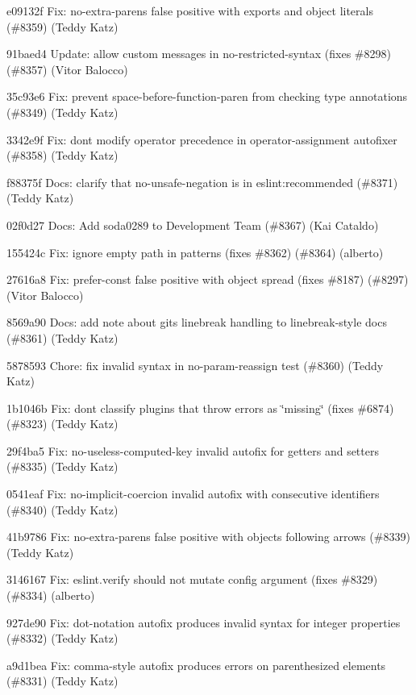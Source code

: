 \begin{DoxyItemize}
\item e09132f Fix\+: no-\/extra-\/parens false positive with exports and object literals (\#8359) (Teddy Katz)
\item 91baed4 Update\+: allow custom messages in no-\/restricted-\/syntax (fixes \#8298) (\#8357) (Vitor Balocco)
\item 35c93e6 Fix\+: prevent space-\/before-\/function-\/paren from checking type annotations (\#8349) (Teddy Katz)
\item 3342e9f Fix\+: don\textquotesingle{}t modify operator precedence in operator-\/assignment autofixer (\#8358) (Teddy Katz)
\item f88375f Docs\+: clarify that no-\/unsafe-\/negation is in eslint\+:recommended (\#8371) (Teddy Katz)
\item 02f0d27 Docs\+: Add soda0289 to Development Team (\#8367) (Kai Cataldo)
\item 155424c Fix\+: ignore empty path in patterns (fixes \#8362) (\#8364) (alberto)
\item 27616a8 Fix\+: prefer-\/const false positive with object spread (fixes \#8187) (\#8297) (Vitor Balocco)
\item 8569a90 Docs\+: add note about git\textquotesingle{}s linebreak handling to linebreak-\/style docs (\#8361) (Teddy Katz)
\item 5878593 Chore\+: fix invalid syntax in no-\/param-\/reassign test (\#8360) (Teddy Katz)
\item 1b1046b Fix\+: don\textquotesingle{}t classify plugins that throw errors as \char`\"{}missing\char`\"{} (fixes \#6874) (\#8323) (Teddy Katz)
\item 29f4ba5 Fix\+: no-\/useless-\/computed-\/key invalid autofix for getters and setters (\#8335) (Teddy Katz)
\item 0541eaf Fix\+: no-\/implicit-\/coercion invalid autofix with consecutive identifiers (\#8340) (Teddy Katz)
\item 41b9786 Fix\+: no-\/extra-\/parens false positive with objects following arrows (\#8339) (Teddy Katz)
\item 3146167 Fix\+: {\ttfamily eslint.\+verify} should not mutate config argument (fixes \#8329) (\#8334) (alberto)
\item 927de90 Fix\+: dot-\/notation autofix produces invalid syntax for integer properties (\#8332) (Teddy Katz)
\item a9d1bea Fix\+: comma-\/style autofix produces errors on parenthesized elements (\#8331) (Teddy Katz)

\end{DoxyItemize}
